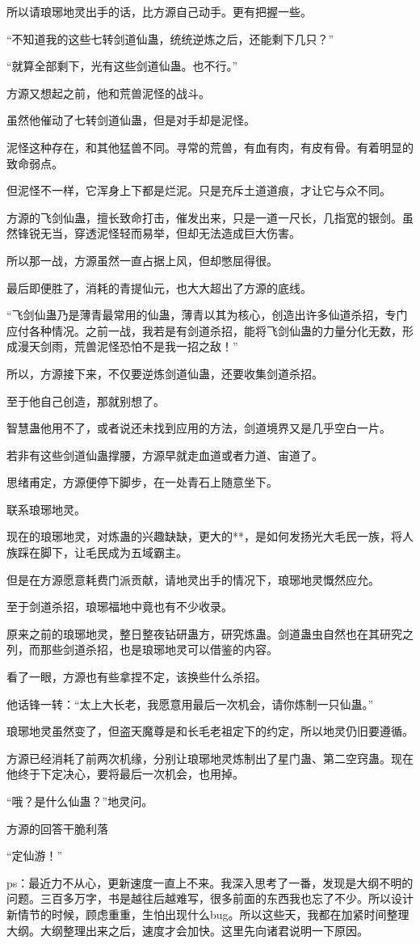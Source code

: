 \begin{this_body}
所以请琅琊地灵出手的话，比方源自己动手。更有把握一些。

“不知道我的这些七转剑道仙蛊，统统逆炼之后，还能剩下几只？”

“就算全部剩下，光有这些剑道仙蛊。也不行。”

方源又想起之前，他和荒兽泥怪的战斗。

虽然他催动了七转剑道仙蛊，但是对手却是泥怪。

泥怪这种存在，和其他猛兽不同。寻常的荒兽，有血有肉，有皮有骨。有着明显的致命弱点。

但泥怪不一样，它浑身上下都是烂泥。只是充斥土道道痕，才让它与众不同。

方源的飞剑仙蛊，擅长致命打击，催发出来，只是一道一尺长，几指宽的银剑。虽然锋锐无当，穿透泥怪轻而易举，但却无法造成巨大伤害。

所以那一战，方源虽然一直占据上风，但却憋屈得很。

最后即便胜了，消耗的青提仙元，也大大超出了方源的底线。

“飞剑仙蛊乃是薄青最常用的仙蛊，薄青以其为核心，创造出许多仙道杀招，专门应付各种情况。之前一战，我若是有剑道杀招，能将飞剑仙蛊的力量分化无数，形成漫天剑雨，荒兽泥怪恐怕不是我一招之敌！”

所以，方源接下来，不仅要逆炼剑道仙蛊，还要收集剑道杀招。

至于他自己创造，那就别想了。

智慧蛊他用不了，或者说还未找到应用的方法，剑道境界又是几乎空白一片。

若非有这些剑道仙蛊撑腰，方源早就走血道或者力道、宙道了。

思绪甫定，方源便停下脚步，在一处青石上随意坐下。

联系琅琊地灵。

现在的琅琊地灵，对炼蛊的兴趣缺缺，更大的**，是如何发扬光大毛民一族，将人族踩在脚下，让毛民成为五域霸主。

但是在方源愿意耗费门派贡献，请地灵出手的情况下，琅琊地灵慨然应允。

至于剑道杀招，琅琊福地中竟也有不少收录。

原来之前的琅琊地灵，整日整夜钻研蛊方，研究炼蛊。剑道蛊虫自然也在其研究之列，而那些剑道杀招，也是琅琊地灵可以借鉴的内容。

看了一眼，方源也有些拿捏不定，该换些什么杀招。

他话锋一转：“太上大长老，我愿意用最后一次机会，请你炼制一只仙蛊。”

琅琊地灵虽然变了，但盗天魔尊是和长毛老祖定下的约定，所以地灵仍旧要遵循。

方源已经消耗了前两次机缘，分别让琅琊地灵炼制出了星门蛊、第二空窍蛊。现在他终于下定决心，要将最后一次机会，也用掉。

“哦？是什么仙蛊？”地灵问。

方源的回答干脆利落

“定仙游！”

ps：最近力不从心，更新速度一直上不来。我深入思考了一番，发现是大纲不明的问题。三百多万字，书是越往后越难写，很多前面的东西我也忘了不少。所以设计新情节的时候，顾虑重重，生怕出现什么bug。所以这些天，我都在加紧时间整理大纲。大纲整理出来之后，速度才会加快。这里先向诸君说明一下原因。

\end{this_body}


